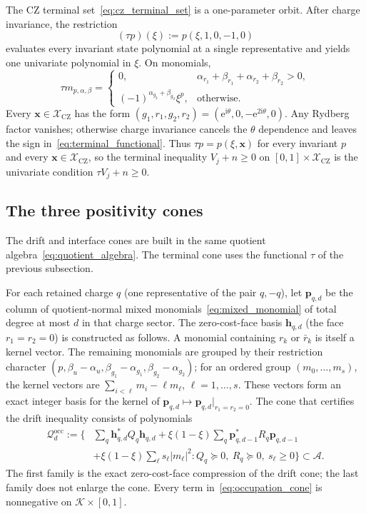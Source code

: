 \documentclass[aps,prx,reprint,nofootinbib,longbibliography,floatfix]{revtex4-2}
\theoremstyle{plain}
\theoremstyle{remark}
\newcommand{\ee}{\mathrm{e}}
\newcommand{\ii}{\mathrm{i}}
\newcommand{\xv}{\boldsymbol{x}}
\begin{document}
The CZ terminal set~\eqref{eq:cz_terminal_set} is a one-parameter orbit.
After charge invariance, the restriction
\begin{equation}
(\tau p)(\xi):=p(\xi,1,0,-1,0)
\label{eq:tau_main}
\end{equation}
evaluates every invariant state polynomial at a single representative and
yields one univariate polynomial in $\xi$. On monomials,
\begin{equation}
\tau m_{p,\alpha,\beta}
=
\begin{cases}
0,
&\alpha_{r_1}+\beta_{r_1}+\alpha_{r_2}+\beta_{r_2}>0,\\[2mm]
(-1)^{\alpha_{g_2}+\beta_{g_2}}\xi^p,
&\text{otherwise}.
\end{cases}
\label{eq:terminal_functional}
\end{equation}
Every $\xv\in\mathcal X_{\mathrm{CZ}}$ has the form
$(g_1,r_1,g_2,r_2)=(\ee^{\ii\theta},0,-\ee^{2\ii\theta},0)$. Any Rydberg factor
vanishes; otherwise charge invariance cancels the $\theta$ dependence and
leaves the sign in~\eqref{eq:terminal_functional}. Thus
$\tau p=p(\xi,\xv)$ for every invariant $p$ and every $\xv\in\mathcal X_{\mathrm{CZ}}$,
so the terminal inequality $V_j+n\ge0$ on
$[0,1]\times\mathcal{X}_{\mathrm{CZ}}$ is the univariate condition
$\tau V_j+n\ge0$.

\subsection{The three positivity cones}
The drift and interface cones are built in the same quotient
algebra~\eqref{eq:quotient_algebra}. The terminal cone uses the functional
$\tau$ of the previous subsection.

For each retained charge $q$ (one representative of the pair $q,-q$), let
$\mathbf p_{q,d}$ be the column of quotient-normal mixed
monomials~\eqref{eq:mixed_monomial} of total degree at most $d$ in that
charge sector. The zero-cost-face basis $\mathbf h_{q,d}$ (the face
$r_1=r_2=0$) is constructed as follows. A monomial containing $r_k$ or $\bar r_k$
is itself a kernel vector. The remaining monomials are grouped by their
restriction character
$(p,\beta_u-\alpha_u,\beta_{g_1}-\alpha_{g_1},\beta_{g_2}-\alpha_{g_2})$; for an
ordered group $(m_0,\ldots,m_s)$, the kernel vectors are
$\sum_{i<\ell}m_i-\ell m_\ell$, $\ell=1,\ldots,s$. These vectors form an exact
integer basis for the kernel of
$\mathbf p_{q,d}\mapsto\mathbf p_{q,d}|_{r_1=r_2=0}$. The cone that certifies
the drift inequality consists of polynomials
\begin{equation}
\begin{split}
\mathcal Q^{\mathrm{occ}}_d:=\biggl\{&
\sum_q\mathbf h_{q,d}^{*}Q_q\mathbf h_{q,d}
+\xi(1-\xi)\sum_q\mathbf p_{q,d-1}^{*}R_q\mathbf p_{q,d-1}\\
&+\xi(1-\xi)\sum_{\ell}s_\ell|m_\ell|^2:
Q_q\succeq0,\ R_q\succeq0,\ s_\ell\ge0\biggr\}\subset\mathcal A.
\end{split}
\label{eq:occupation_cone}
\end{equation}
The first family is the exact zero-cost-face compression of the drift cone;
the last family does not enlarge the cone. Every term
in~\eqref{eq:occupation_cone} is nonnegative on $\mathcal K\times[0,1]$.
\end{document}
